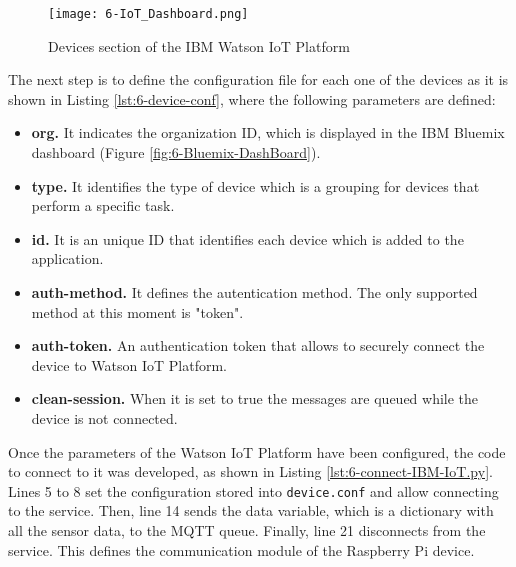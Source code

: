 \begin{figure}[!h]
	\begin{center}
		\texttt{[image: 6-IoT\_Dashboard.png]}
		\caption{Devices section of the IBM Watson IoT Platform}
		\label{fig:6-IoT_Dashboard}
	\end{center}
\end{figure}

The next step is to define the configuration file for each one of the devices as it is shown in Listing \ref{lst:6-device-conf}, where the following parameters are defined:
\begin{itemize}
	\item \textbf{org.} It indicates the organization ID, which is displayed in the IBM Bluemix dashboard (Figure \ref{fig:6-Bluemix-DashBoard}).
	\item \textbf{type.} It identifies the type of device which is a grouping for devices that perform a specific task.
	\item \textbf{id.} It is an unique ID that identifies each device which is added to the application.
	\item \textbf{auth-method.} It defines the autentication method. The only supported method at this moment is "token".
	\item \textbf{auth-token.} An authentication token that allows to securely connect the device to Watson \ac{IoT} Platform.
	\item \textbf{clean-session.} When it is set to true the messages are queued while the device is not connected.
\end{itemize}

\clearpage


Once the parameters of the Watson \ac{IoT} Platform have been configured, the code to connect to it was developed, as shown in Listing \ref{lst:6-connect-IBM-IoT.py}. Lines 5 to 8 set the configuration stored into \texttt{device.conf} and allow connecting to the service. Then, line 14 sends the data variable, which is a dictionary with all the sensor data, to the MQTT queue. Finally, line 21 disconnects from the service. This defines the communication module of the Raspberry Pi device.



